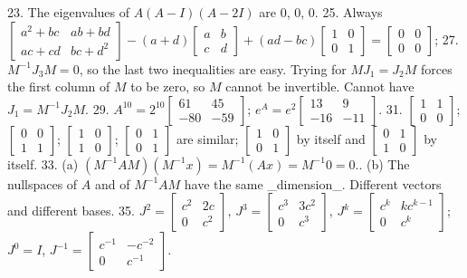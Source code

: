 23. The eigenvalues of \(A(A-I)(A-2I)\) are \(0\), \(0\), \(0\).
25. Always \(\begin{bmatrix}a^{2}+bc&ab+bd\\ ac+cd&bc+d^{2}\end{bmatrix}-(a+d)\begin{bmatrix}a&b\\ c&d\end{bmatrix}+(ad-bc)\begin{bmatrix}1&0\\ 0&1\end{bmatrix}=\begin{bmatrix}0&0\\ 0&0\end{bmatrix}\);
27. \(M^{-1}J_{3}M=0\), so the last two inequalities are easy. Trying for \(MJ_{1}=J_{2}M\) forces the first column of \(M\) to be zero, so \(M\) cannot be invertible. Cannot have \(J_{1}=M^{-1}J_{2}M\).
29. \(A^{10}=2^{10}\begin{bmatrix}61&45\\ -80&-59\end{bmatrix}\); \(e^{A}=e^{2}\begin{bmatrix}13&9\\ -16&-11\end{bmatrix}\).
31. \(\begin{bmatrix}1&1\\ 0&0\end{bmatrix}\); \(\begin{bmatrix}0&0\\ 1&1\end{bmatrix}\); \(\begin{bmatrix}1&0\\ 1&0\end{bmatrix}\); \(\begin{bmatrix}0&1\\ 0&1\end{bmatrix}\) are similar; \(\begin{bmatrix}1&0\\ 0&1\end{bmatrix}\) by itself and \(\begin{bmatrix}0&1\\ 1&0\end{bmatrix}\) by itself.
33. (a) \((M^{-1}AM)(M^{-1}x)=M^{-1}(Ax)=M^{-1}0=0\).. (b) The nullspaces of \(A\) and of \(M^{-1}AM\) have the same _dimension_. Different vectors and different bases.
35. \(J^{2}=\begin{bmatrix}c^{2}&2c\\ 0&c^{2}\end{bmatrix}\), \(J^{3}=\begin{bmatrix}c^{3}&3c^{2}\\ 0&c^{3}\end{bmatrix}\), \(J^{k}=\begin{bmatrix}c^{k}&kc^{k-1}\\ 0&c^{k}\end{bmatrix}\); \(J^{0}=I\), \(J^{-1}=\begin{bmatrix}c^{-1}&-c^{-2}\\ 0&c^{-1}\end{bmatrix}\).
